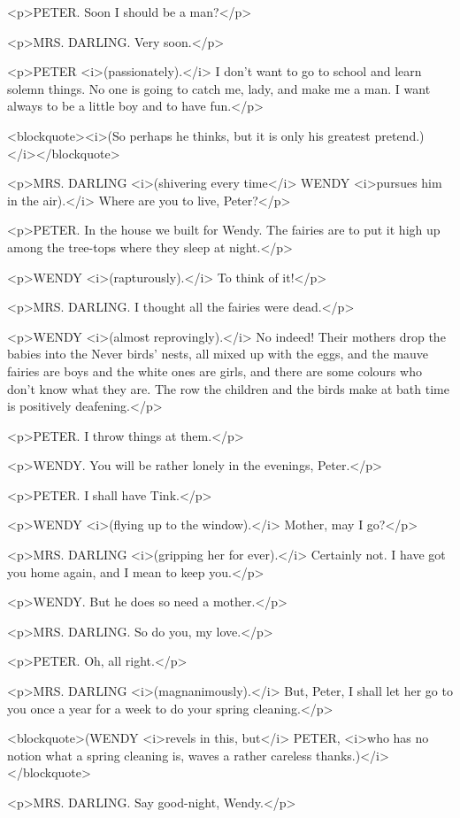 <p>PETER. Soon I should be a man?</p>

<p>MRS. DARLING. Very soon.</p>

<p>PETER <i>(passionately).</i> I don't want to go to school and
learn solemn things. No one is going to catch me, lady, and make me a
man. I want always to be a little boy and to have fun.</p>

<blockquote><i>(So perhaps he thinks, but it is only his greatest
pretend.)</i></blockquote>

<p>MRS. DARLING <i>(shivering every time</i> WENDY <i>pursues him in
the air).</i> Where are you to live, Peter?</p>

<p>PETER. In the house we built for Wendy. The fairies are to put it
high up among the tree-tops where they sleep at night.</p>

<p>WENDY <i>(rapturously).</i> To think of it!</p>

<p>MRS. DARLING. I thought all the fairies were dead.</p>

<p>WENDY <i>(almost reprovingly).</i> No indeed! Their mothers drop
the babies into the Never birds' nests, all mixed up with the eggs,
and the mauve fairies are boys and the white ones are girls, and
there are some colours who don't know what they are. The row the
children and the birds make at bath time is positively deafening.</p>

<p>PETER. I throw things at them.</p>

<p>WENDY. You will be rather lonely in the evenings, Peter.</p>

<p>PETER. I shall have Tink.</p>

<p>WENDY <i>(flying up to the window).</i> Mother, may I go?</p>

<p>MRS. DARLING <i>(gripping her for ever).</i> Certainly not. I have
got you home again, and I mean to keep you.</p>

<p>WENDY. But he does so need a mother.</p>

<p>MRS. DARLING. So do you, my love.</p>

<p>PETER. Oh, all right.</p>

<p>MRS. DARLING <i>(magnanimously).</i> But, Peter, I shall let her
go to you once a year for a week to do your spring cleaning.</p>

<blockquote>(WENDY <i>revels in this, but</i> PETER, <i>who has no
notion what a spring cleaning is, waves a rather careless
thanks.)</i></blockquote>

<p>MRS. DARLING. Say good-night, Wendy.</p>

